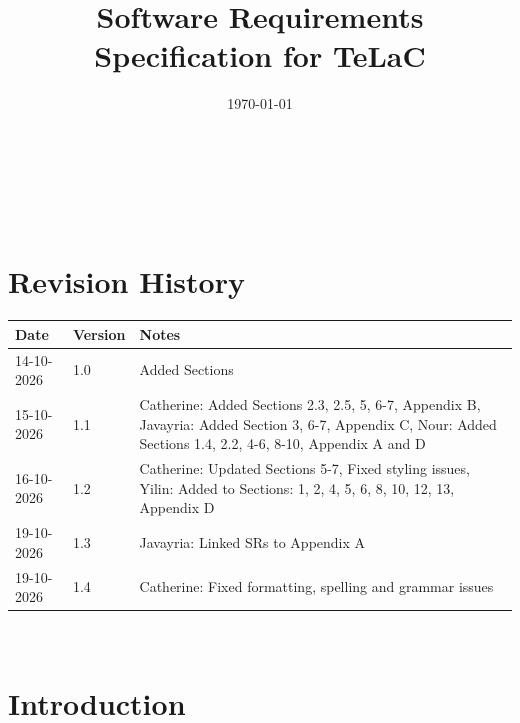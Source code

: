 \documentclass[12pt]{article}
\begin{document}
\title{Software Requirements Specification for TeLaC} 
\author{\authname}
\date{\today}
	
\maketitle

~\newpage


\tableofcontents

~\newpage

\section*{Revision History}

\begin{tabularx}{\textwidth}{p{3cm}p{2cm}X}
\toprule {\bf Date} & {\bf Version} & {\bf Notes}\\
\midrule
14-10-2026 & 1.0 & Added Sections\\
15-10-2026 & 1.1 & Catherine: Added Sections 2.3, 2.5, 5, 6-7, Appendix B, Javayria: Added Section 3, 6-7, Appendix C, Nour: Added Sections 1.4, 2.2, 4-6, 8-10, Appendix A and D\\
16-10-2026 & 1.2 & Catherine: Updated Sections 5-7, Fixed styling issues, Yilin: Added to Sections: 1, 2, 4, 5, 6, 8, 10, 12, 13, Appendix D\\
19-10-2026 & 1.3 & Javayria: Linked SRs to Appendix A\\
19-10-2026 & 1.4 & Catherine: Fixed formatting, spelling and grammar issues\\
\bottomrule
\end{tabularx}

~\\


\newpage






















\section{Introduction} 
\end{document}
